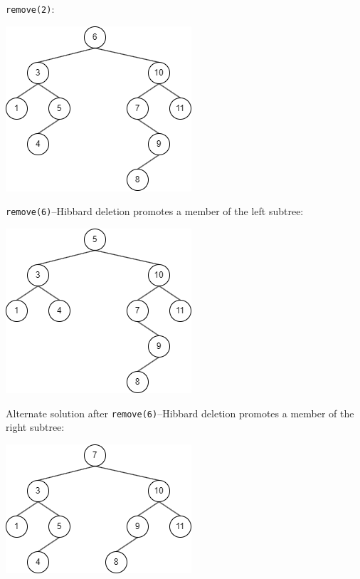 \begin{solution}
\lstinline{remove(2)}:

\includegraphics[scale=0.75]{topics/trees/binary-search-trees/medium/bst-insertion-removal-images/remove2.png}

\lstinline{remove(6)}--Hibbard deletion promotes a member of the left subtree:

\includegraphics[scale=0.75]{topics/trees/binary-search-trees/medium/bst-insertion-removal-images/remove6.png}

Alternate solution after \lstinline{remove(6)}--Hibbard deletion promotes a member of the right subtree:

\includegraphics[scale=0.75]{topics/trees/binary-search-trees/medium/bst-insertion-removal-images/remove6_2.png}
\end{solution}
